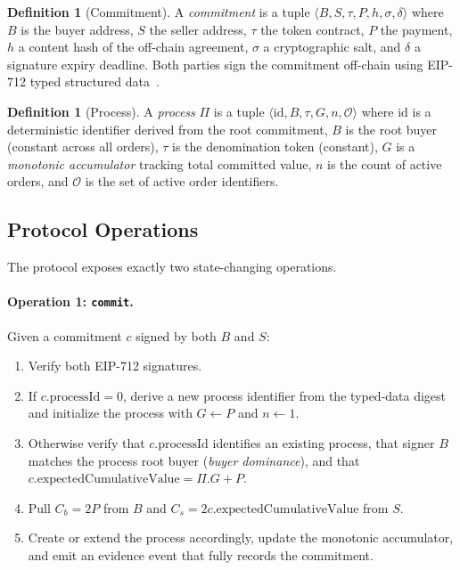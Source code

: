 \documentclass[11pt,a4paper]{article}
\theoremstyle{definition}
\newtheorem{definition}[theorem]{Definition}
\theoremstyle{remark}
\newcommand{\pay}{P}           %
\newcommand{\cumval}{G}        %
\newcommand{\sbond}{C_s}       %
\newcommand{\bbond}{C_b}       %
\begin{document}
\begin{definition}[Commitment]
\label{def:commitment}
A \emph{commitment} is a tuple $\langle B, S, \tau, \pay, h, \sigma,
\delta \rangle$ where $B$ is the buyer address, $S$ the seller address,
$\tau$ the token contract, $\pay$ the payment, $h$ a content hash of
the off-chain agreement, $\sigma$ a cryptographic salt, and $\delta$ a
signature expiry deadline. Both parties sign the commitment off-chain
using EIP-712 typed structured data~\citep{eip712}.
\end{definition}

\begin{definition}[Process]
\label{def:process}
A \emph{process} $\Pi$ is a tuple $\langle \text{id}, B, \tau, \cumval,
n, \mathcal{O} \rangle$ where $\text{id}$ is a deterministic identifier
derived from the root commitment, $B$ is the root buyer (constant across
all orders), $\tau$ is the denomination token (constant), $\cumval$ is a
\emph{monotonic accumulator} tracking total committed value, $n$ is the
count of active orders, and $\mathcal{O}$ is the set of active order
identifiers.
\end{definition}

\subsection{Protocol Operations}

The protocol exposes exactly two state-changing operations.

\paragraph{Operation 1: \texttt{commit}.}
Given a commitment $c$ signed by both $B$ and $S$:
\begin{enumerate}
  \item Verify both EIP-712 signatures.
  \item If $c.\text{processId} = 0$, derive a new process identifier from
    the typed-data digest and initialize the process with
    $\cumval \gets \pay$ and $n \gets 1$.
  \item Otherwise verify that $c.\text{processId}$ identifies an
    existing process, that signer $B$ matches the process root buyer
    (\emph{buyer dominance}), and that
    $c.\text{expectedCumulativeValue} = \Pi.\cumval + \pay$.
  \item Pull $\bbond = 2\pay$ from $B$ and
    $\sbond = 2c.\text{expectedCumulativeValue}$ from $S$.
  \item Create or extend the process accordingly, update the monotonic
    accumulator, and emit an evidence event that fully records the
    commitment.
\end{enumerate}
\end{document}
